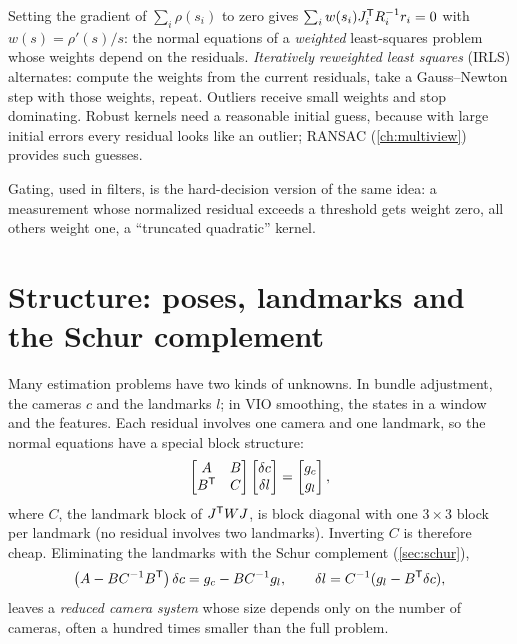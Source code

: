 Setting the gradient of $\sum_i\rho(s_i)$ to zero gives $\sum_iw(s_i)J_i^{\mathsf{T}} R_i^{-1} r_i = 0$ with $w(s) = \rho'(s)/s$: the normal equations of a \emph{weighted}
least-squares problem whose weights depend on the residuals. \emph{Iteratively reweighted least squares} (IRLS) alternates: compute the weights
from the current residuals, take a Gauss--Newton step with those weights, repeat. Outliers receive small weights and stop dominating. Robust
kernels need a reasonable initial guess, because with large initial errors every residual looks like an outlier; RANSAC (\cref{ch:multiview})
provides such guesses.

Gating, used in filters, is the hard-decision version of the same idea: a measurement whose normalized residual exceeds a threshold gets weight
zero, all others weight one, a ``truncated quadratic'' kernel.

\section{Structure: poses, landmarks and the Schur complement}
\label{sec:schur-ba}

Many estimation problems have two kinds of unknowns. In bundle adjustment, the cameras $c$ and the landmarks $l$; in VIO smoothing, the states in
a window and the features. Each residual involves one camera and one landmark, so the normal equations have a special block structure:
\begin{equation}
  \begin{bmatrix} A & B \\ B^{\mathsf{T}} & C \end{bmatrix}\begin{bmatrix}\delta c\\ \delta l\end{bmatrix} = \begin{bmatrix}g_c\\ g_l\end{bmatrix},
\end{equation}
where $C$, the landmark block of $J^{\mathsf{T}} WJ$, is block diagonal with one $3\times3$ block per landmark (no residual involves two landmarks). Inverting $C$ is
therefore cheap. Eliminating the landmarks with the Schur complement (\cref{sec:schur}),
\begin{equation}
  \big(A - BC^{-1} B^{\mathsf{T}}\big)\,\delta c = g_c - BC^{-1} g_l, \qquad \delta l = C^{-1}(g_l - B^{\mathsf{T}}\delta c),
  \label{eq:reduced-camera-system}
\end{equation}
leaves a \emph{reduced camera system} whose size depends only on the number of cameras, often a hundred times smaller than the full problem.

